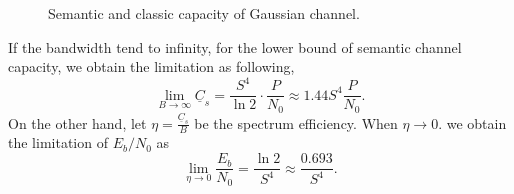 \documentclass[12pt, draftclsnofoot,onecolumn]{IEEEtran}
\begin{document}
\begin{figure}[htbp]
\setlength{\abovecaptionskip}{0.cm}
\setlength{\belowcaptionskip}{-0.cm}
  \caption{Semantic and classic capacity of Gaussian channel.}\label{Channel_capacity_comp}
\end{figure}

If the bandwidth tend to infinity, for the lower bound of semantic channel capacity, we obtain the limitation as following,
\begin{equation}
\lim_{B\to \infty} \underline{C}_s = \frac{S^4}{\ln2}\cdot\frac{ P}{ N_0} \approx 1.44S^4\frac{ P}{ N_0}.
\end{equation}
On the other hand, let $\eta=\frac{\underline{C}_s}{B}$ be the spectrum efficiency. When $\eta\to0$. we obtain the limitation of $E_b/N_0$ as
\begin{equation}
\lim_{\eta\to0}\frac{E_b}{N_0}=\frac{\ln 2}{S^4}\approx \frac{0.693}{S^4}.
\end{equation}
\end{document}
